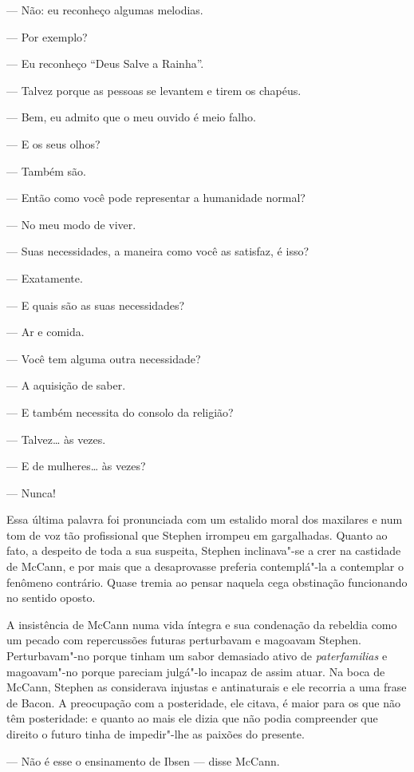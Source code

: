 --- Não: eu reconheço algumas melodias.

--- Por exemplo?

--- Eu reconheço “Deus Salve a Rainha”.

--- Talvez porque as pessoas se levantem e tirem os chapéus.

--- Bem, eu admito que o meu ouvido é meio falho.

--- E os seus olhos?

--- Também são.

--- Então como você pode representar a humanidade normal?

--- No meu modo de viver.

--- Suas necessidades, a maneira como você as satisfaz, é
isso?

--- Exatamente.

--- E quais são as suas necessidades?

--- Ar e comida.

--- Você tem alguma outra necessidade?

--- A aquisição de saber.

--- E também necessita do consolo da religião?

--- Talvez\ldots{} às vezes.

--- E de mulheres\ldots{} às vezes?

--- Nunca!

Essa última palavra foi pronunciada com um estalido moral dos
maxilares e num tom de voz tão profissional que Stephen irrompeu em
gargalhadas.  Quanto ao fato, a despeito de toda a sua suspeita,
Stephen inclinava"-se a crer na castidade de McCann, e por mais que a
desaprovasse preferia contemplá"-la a contemplar o fenômeno contrário.
Quase tremia ao pensar naquela cega obstinação funcionando no sentido
oposto.

A insistência de McCann numa vida íntegra e sua condenação da
rebeldia como um pecado com repercussões futuras perturbavam e magoavam
Stephen.  Perturbavam"-no porque tinham um sabor demasiado ativo de
\textit{paterfamilias} e magoavam"-no porque pareciam julgá"-lo incapaz
de assim atuar.  Na boca de McCann, Stephen as considerava injustas e
antinaturais e ele recorria a uma frase de Bacon.  A preocupação com a
posteridade, ele citava, é maior para os que não têm posteridade: e
quanto ao mais ele dizia que \label{nao"-podia} não podia compreender que direito o
futuro tinha de impedir"-lhe as paixões do presente.

--- Não é esse o ensinamento de Ibsen --- disse McCann.

